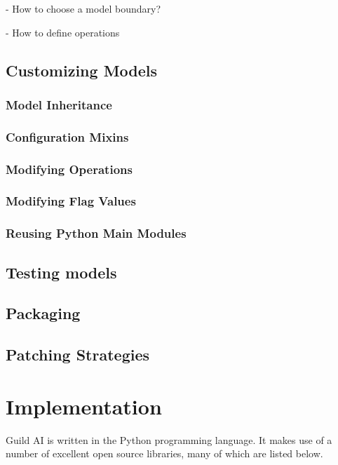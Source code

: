 \documentclass{article}
\begin{document}
- How to choose a model boundary?

- How to define operations

\subsection{Customizing Models}

\subsubsection{Model Inheritance}

\subsubsection{Configuration Mixins}

\subsubsection{Modifying Operations}

\subsubsection{Modifying Flag Values}

\subsubsection{Reusing Python Main Modules}

\subsection{Testing models}

\subsection{Packaging}

\subsection{Patching Strategies}

\section{Implementation}

Guild AI is written in the Python programming language. It makes use
of a number of excellent open source libraries, many of which are
listed below.
\end{document}
